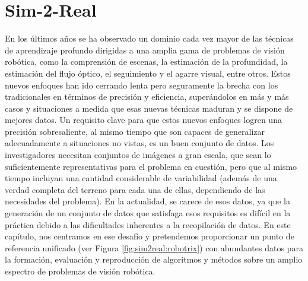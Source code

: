\chapter{Sim-2-Real}

En los últimos años se ha observado un dominio cada vez mayor de las técnicas de aprendizaje profundo dirigidas a una amplia gama de problemas de visión robótica, como la comprensión de escenas, la estimación de la profundidad, la estimación del flujo óptico, el seguimiento y el agarre visual, entre otros. Estos nuevos enfoques han ido cerrando lenta pero seguramente la brecha con los tradicionales en términos de precisión y eficiencia, superándolos en más y más casos y situaciones a medida que esas nuevas técnicas maduran y se dispone de mejores datos. Un requisito clave para que estos nuevos enfoques logren una precisión sobresaliente, al mismo tiempo que son capaces de generalizar adecuadamente a situaciones no vistas, es un buen conjunto de datos. Los investigadores necesitan conjuntos de imágenes a gran escala, que sean lo suficientemente representativas para el problema en cuestión, pero que al mismo tiempo incluyan una cantidad considerable de variabilidad (además de una verdad completa del terreno para cada una de ellas, dependiendo de las necesidades del problema). En la actualidad, se carece de esos datos, ya que la generación de un conjunto de datos que satisfaga esos requisitos es difícil en la práctica debido a las dificultades inherentes a la recopilación de datos. En este capítulo, nos centramos en ese desafío y pretendemos proporcionar un punto de referencia unificado (ver Figura \ref{fig:sim2real:robotrix}) con abundantes datos para la formación, evaluación y reproducción de algoritmos y métodos sobre un amplio espectro de problemas de visión robótica.

